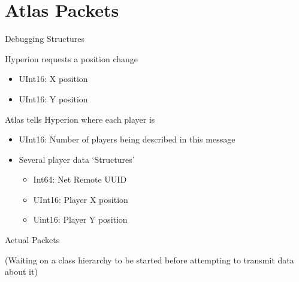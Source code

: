 \documentclass[10pt,a4paper]{scrreprt}
\begin{document}
	\section{Atlas Packets}
	\begin{description}[leftmargin=!,labelwidth=0.35\textwidth, itemsep=2ex]
		\item \begin{Large} Debugging Structures \end{Large}
		\item[Request Position Change]
			Hyperion requests a position change
			\begin{itemize}
				\item UInt16: X position
				\item UInt16: Y position
			\end{itemize}	
		\item[Update Positions]	
			Atlas tells Hyperion where each player is
			\begin{itemize}
				\item UInt16: Number of players being described in this message
				\item Several player data `Structures'
					\begin{itemize}
						\item Int64: Net Remote UUID
						\item UInt16: Player X position
						\item Uint16: Player Y position
					\end{itemize}
			\end{itemize}
		\item \begin{Large} Actual Packets \end{Large}
		\item (Waiting on a class hierarchy to be started before attempting to transmit data about it)
	\end{description}
\end{document}
